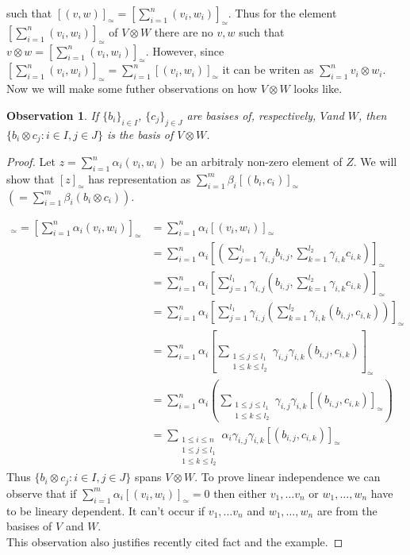 \documentclass[a4paper, 12pt]{report}
\newtheorem{observation}{Observation}
\begin{document}
such that $ [(v,w)]_\simeq = \left[\displaystyle\sum^n_{i=1}(v_i,w_i)\right]_\simeq$.
Thus for the element $\left[\displaystyle\sum^n_{i=1}(v_i,w_i)\right]_\simeq$ of $V\otimes W$
there are no $v, w$ such that $v \otimes w = \left[\displaystyle\sum^n_{i=1}(v_i,w_i)\right]_\simeq$.
However, since $\left[\displaystyle\sum^n_{i=1}(v_i,w_i)\right]_\simeq =
\displaystyle\sum^n_{i=1}[(v_i,w_i)]_\simeq$ it can be writen as
$\displaystyle\sum^n_{i=1}v_i \otimes w_i$. \\
Now we will make some futher observations on how $V \otimes W$ looks like.
\begin{observation}
\label{observation:1}
If $\{b_i\}_{i \in I}$, $\{c_j\}_{j \in J}$ are basises of, respectively, $V$and $W$,
then $\{b_i \otimes c_j : i \in I, j \in J\}$ is the basis of $V \otimes W$.
\end{observation}
\begin{proof}
Let $z = \displaystyle\sum^n_{i = 1}\alpha_i(v_i,w_i)$ be an arbitraly non-zero element of $Z$. We will show
that $[z]_\simeq$ has representation as $\displaystyle\sum^m_{i = 1}\beta_i [(b_i,c_i)]_\simeq$
$\left(=\displaystyle\sum^m_{i = 1}\beta_i(b_i \otimes c_i)\right)$.

\begin{align*}
[z]_\simeq = \left[\sum^n_{i = 1}\alpha_i(v_i,w_i)\right]_\simeq &=
\sum^n_{i = 1}\alpha_i[(v_i,w_i)]_\simeq \\
&= \sum^n_{i = 1}\alpha_i\left[\left(\sum^{l_1}_{j=1}\gamma_{i,j}b_{i,j},
\sum^{l_2}_{k=1}\gamma_{i,k}c_{i,k}\right)\right]_\simeq \\
&= \sum^n_{i = 1}\alpha_i\left[\sum^{l_1}_{j=1}\gamma_{i,j}\left(b_{i,j},
\sum^{l_2}_{k=1}\gamma_{i,k}c_{i,k}\right)\right]_\simeq \\
&= \sum^n_{i = 1}\alpha_i\left[\sum^{l_1}_{j=1}\gamma_{i,j}\left(\sum^{l_2}_{k=1}\gamma_{i,k}
\left(b_{i,j},c_{i,k}\right)\right)\right]_\simeq \\
&= \sum^n_{i = 1}\alpha_i\left[\sum_{\substack{1 \leq j \leq l_1 \\ 1 \leq k \leq l_2}}
\gamma_{i,j}\gamma_{i,k}(b_{i,j}, c_{i,k})\right]_\simeq \\
&= \sum^n_{i = 1}\alpha_i\left(\sum_{\substack{1 \leq j \leq l_1 \\ 1 \leq k \leq l_2}}
\gamma_{i,j}\gamma_{i,k}[(b_{i,j}, c_{i,k})]_\simeq\right) \\
&= \sum_{\substack{1 \leq i \leq n \\1 \leq j \leq l_1 \\ 1 \leq k \leq l_2}}
\alpha_i\gamma_{i,j}\gamma_{i,k}[(b_{i,j}, c_{i,k})]_\simeq
\end{align*}
Thus $\{b_i \otimes c_j : i \in I, j \in J\}$ spans $V \otimes W$. To prove linear independence we can 
observe that if $\displaystyle\sum^m_{i = 1}\alpha_i [(v_i,w_i)]_\simeq = 0$
then either $v_1, \dots v_n$ or $w_1, \dots, w_n$ have to be lineary dependent. It can't occur if
$v_1, \dots v_n$ and $w_1, \dots, w_n$ are from the basises of $V$ and $W$.\\
This observation also justifies
recently cited fact and the example.
\end{proof}
\end{document}
